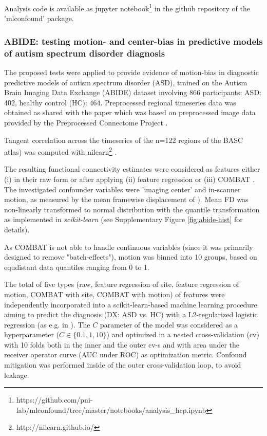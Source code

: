 \documentclass{article}
\begin{document}
Analysis code is available as jupyter notebook\footnote{https://github.com/pni-lab/mlconfound/tree/master/notebooks/analysis\_hcp.ipynb} in the github repository of the 'mlconfound' package.


\subsubsection*{ABIDE: testing motion- and center-bias in predictive models of autism spectrum disorder diagnosis}

The proposed tests were applied to provide evidence of motion-bias in diagnostic predictive models of autism spectrum disorder (ASD), trained on the Autism Brain Imaging Data Exchange (ABIDE) dataset \citep{di2014autism} involving 866 participants; ASD: 402, healthy control (HC): 464. Preprocessed regional timeseries data was obtained as shared with the paper \citep{dadi2019benchmarking} which was based on preprocessed image data provided by the Preprocessed Connectome Project \citep{craddock2013neuro}.

Tangent correlation across the timeseries of the n=122 regions of the BASC \citep{bellec2010multi} atlas) was computed with nilearn\footnote{http://nilearn.github.io/} \citep{huntenburg2017loading, esteve2015big}. 

The resulting functional connectivity estimates were considered as features either (i) in their raw form or after applying (ii) feature regression \citep{rao2017predictive} or (iii) COMBAT \citep{johnson2007adjusting, fortin2018harmonization}.
The investigated confounder variables were 'imaging center' and in-scanner motion, as measured by the mean framewise displacement of \cite{power2014methods}).
Mean FD was non-linearly transformed to normal distribution with the quantile transformation \citep{beasley2009rank} as implemented in \emph{scikit-learn} \citep{pedregosa2011scikit} (see Supplementary Figure \ref{fig:abide-hist} for details).

As COMBAT is not able to handle continuous variables (since it was primarily designed to remove "batch-effects"), motion was binned into 10 groups, based on equdistant data quantiles ranging from 0 to 1.

The total of five types (raw, feature regression of site, feature regression of motion, COMBAT with site, COMBAT with motion) of features were independently incorporated into a scikit-learn-based \citep{pedregosa2011scikit} machine learning procedure aiming to predict the diagnosis (DX: ASD vs. HC) with a L2-regularized logistic regression (as e.g. in \citep{dadi2019benchmarking}). The $C$ parameter of the model was considered as a hyperparameter ($C \in \{0.1, 1, 10\}$) and optimized in a nested cross-validation (cv) with 10 folds both in the inner and the outer cv-s and with area under the receiver operator curve (AUC under ROC) as optimization metric. Confound mitigation was performed inside of the outer cross-validation loop, to avoid leakage.
\end{document}
